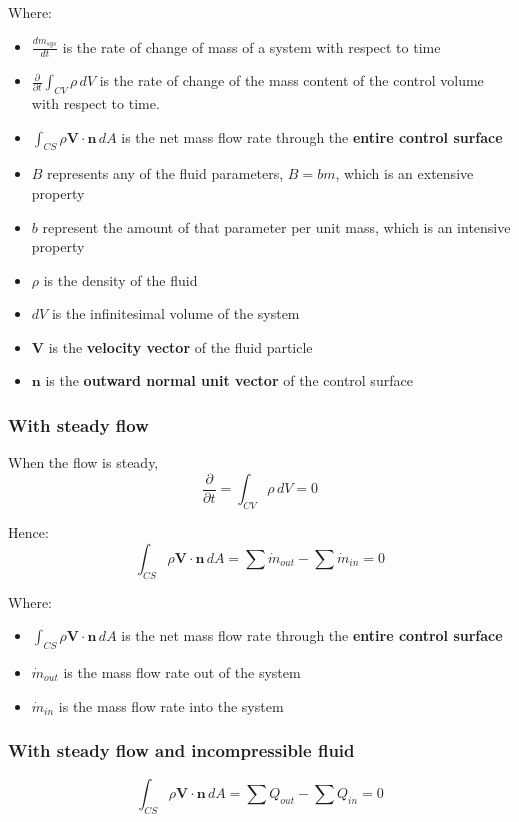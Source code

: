 \documentclass[11pt]{article}
\begin{document}
Where:
\begin{itemize}
\item \(\frac{dm_{sys}}{dt}\) is the rate of change of mass of a system with respect to time
\item \(\frac{\partial}{\partial t} \int_{CV} \rho \, dV\) is the rate of change of the mass content of the control volume with respect to time.
\item \(\int_{CS} \rho \boldsymbol{V} \cdot \boldsymbol{n} \, dA\) is the net mass flow rate through the \textbf{entire control surface}
\item \(B\) represents any of the fluid parameters, \(B = bm\), which is an extensive property
\item \(b\) represent the amount of that parameter per unit mass, which is an intensive property
\item \(\rho\) is the density of the fluid
\item \(dV\) is the infinitesimal volume of the system
\item \(\boldsymbol{V}\) is the \textbf{velocity vector} of the fluid particle
\item \(\boldsymbol{n}\) is the \textbf{outward normal unit vector} of the control surface
\end{itemize}

\newpage
\subsubsection{With steady flow}
\label{sec:org3d760ae}
When the flow is steady,
\[\frac{\partial}{\partial t} = \int_{CV} \rho \, dV = 0\]

Hence:
\[\int_{CS} \rho \boldsymbol{V} \cdot \boldsymbol{n} \, dA = \sum \dot{m}_{out} - \sum \dot{m}_{in} = 0\]

Where:
\begin{itemize}
\item \(\int_{CS} \rho \boldsymbol{V} \cdot \boldsymbol{n} \, dA\) is the net mass flow rate through the \textbf{entire control surface}
\item \(\dot{m}_{out}\) is the mass flow rate out of the system
\item \(\dot{m}_{in}\) is the mass flow rate into the system
\end{itemize}
\subsubsection{With steady flow and incompressible fluid}
\label{sec:orga3660df}
\[\int_{CS} \rho \boldsymbol{V} \cdot \boldsymbol{n} \, dA = \sum Q_{out} - \sum Q_{in} = 0\]
\end{document}
